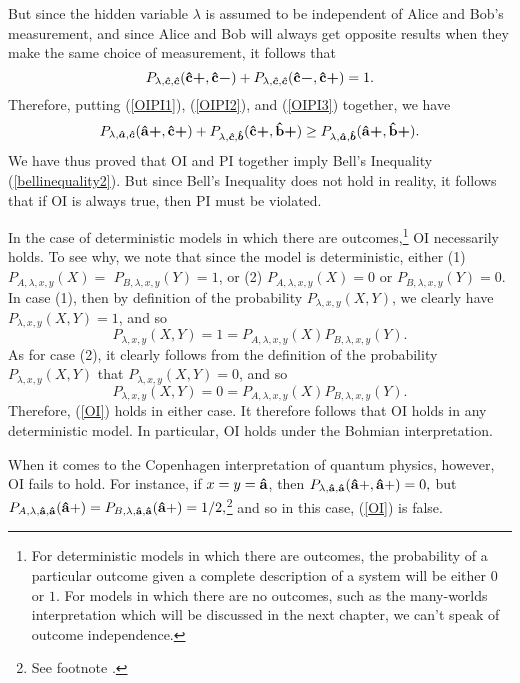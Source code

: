 But since the hidden variable $\lambda$ is assumed to be independent of Alice and Bob's measurement, and since Alice and Bob will always get opposite results when they make the same choice of measurement, it follows that 
\begin{equation}\label{OIPI3}
P_{\lambda,\bm{\hat{c}},\bm{\hat{c}}}({\vb{\hat{{c}}}\bm{+}},{\vb{\hat{{c}}}\bm{-}})+P_{\lambda,\bm{\hat{c}},\bm{\hat{c}}}({\vb{\hat{{c}}}\bm{-}},{\vb{\hat{{c}}}\bm{+}})=1.
\end{equation}
Therefore, putting (\ref{OIPI1}), (\ref{OIPI2}), and (\ref{OIPI3}) together, we have
\begin{equation}
P_{\lambda,\bm{\hat{a}},\bm{\hat{c}}}({\vb{\hat{{a}}}\bm{+}},{\vb{\hat{{c}}}\bm{+}})+P_{\lambda,\bm{\hat{c}},\bm{\hat{b}}}({\vb{\hat{{c}}}\bm{+}},{\vb{\hat{{b}}}\bm{+}})\geq P_{\lambda,\bm{\hat{a}},\bm{\hat{b}}}({\vb{\hat{{a}}}\bm{+}},{\vb{\hat{{b}}}\bm{+}}).
\end{equation}
We have thus proved that OI and PI together imply Bell's Inequality (\ref{bellinequality2}). But since Bell's Inequality does not hold in reality, it follows that if OI is always true, then PI must be violated.\label{OIPIproofend}


\label{OIdet}In the case of deterministic models in which there are outcomes,\footnote{For deterministic models in which there are outcomes, the probability of a particular outcome given a complete description of a system will be either $0$ or $1$. For models in which there are no outcomes, such as the many-worlds interpretation which will be discussed in the next chapter, we can't speak of outcome independence.} OI necessarily holds. To see why, we note that since the model is deterministic, either (1)  $P_{A, \lambda,x,y}(X)=$ $P_{B, \lambda,x,y}(Y)=1$, or (2) $P_{A, \lambda,x,y}(X)=0$ or $P_{B, \lambda,x,y}(Y)=0$. In case (1), then by definition of the probability $P_{\lambda,x,y}(X , Y)$, we clearly have $P_{\lambda,x,y} (X,Y)=1$, and so
$$P_{\lambda,x,y} (X,Y)=1=P_{A, \lambda,x,y}(X)P_{B, \lambda,x,y}(Y).$$
As for case (2), it clearly follows from the definition of the probability $P_{\lambda,x,y}(X , Y)$ that $P_{\lambda,x,y}(X , Y) = 0$, and so
$$P_{\lambda,x,y} (X,Y)=0=P_{A, \lambda,x,y}(X)P_{B, \lambda,x,y}(Y).$$
Therefore, (\ref{OI}) holds in either case. It therefore follows that OI holds in any deterministic model. In particular, OI holds under the Bohmian interpretation. 

When it comes to the Copenhagen interpretation of quantum physics, however, OI fails to hold. For instance, if $x=y=\vb{\hat{a}}$, then $P_{\lambda,\vb{\hat{a}},\vb{\hat{a}}}(\vb{\hat{a}+},\vb{\hat{a}+})=0,$ but $P_{A, \lambda,\vb{\hat{a}},\vb{\hat{a}}}(\vb{\hat{a}+})=P_{B, \lambda,\vb{\hat{a}},\vb{\hat{a}}}(\vb{\hat{a}+})=1/2,$\footnote{See footnote . } and so in this case, (\ref{OI}) is false. 

